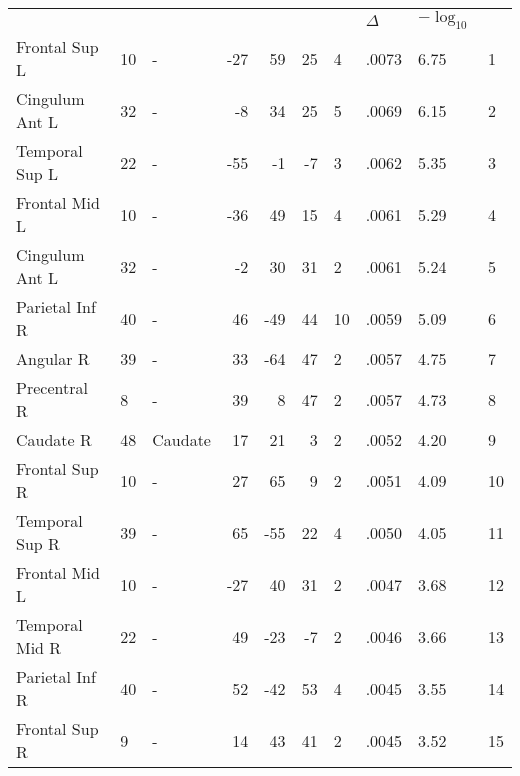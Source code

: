 \begin{table}
    \small
    \centering
    \begin{ThreePartTable}
    \begin{tabularx}{\textwidth}{l l p{1.4cm} *{3}{r} *{2}{P{.8cm}} P{1.3cm} P{.5cm}}
     \\
    \toprule
     &  &  &  &  &  &  & \(\Delta\)  & \(-\log_{10}\) &  \\
    \toprule

    Frontal Sup L  &  10  &  -  &  -27  &  59  &  25  &  4  &   .0073  &  6.75  &  1 \\
    Cingulum Ant L  &  32  &  -  &  -8  &  34  &  25  &  5  &   .0069  &  6.15  &  2 \\
    \midrule
    Temporal Sup L  &  22  &  -  &  -55  &  -1  &  -7  &  3  &   .0062  &  5.35  &  3 \\
    Frontal Mid L  &  10  &  -  &  -36  &  49  &  15  &  4  &   .0061  &  5.29  &  4 \\
    Cingulum Ant L  &  32  &  -  &  -2  &  30  &  31  &  2   &   .0061  &  5.24  &  5 \\
    Parietal Inf R  &  40  &  -  &  46  &  -49  &  44  &  10  &   .0059  &  5.09  &  6 \\
    Angular R  &  39  &  -  &  33  &  -64  &  47  &  2   &   .0057  &  4.75  &  7 \\
    Precentral R  &  8  &  -  &  39  &  8  &  47  &  2   &   .0057  &  4.73  &  8 \\
    Caudate R  &  48  &  Caudate  &  17  &  21  &  3  &  2   &   .0052  &  4.20  &  9 \\
    Frontal Sup R  &  10  &  -  &  27  &  65  &  9  &  2   &   .0051  &  4.09  &  10 \\
    Temporal Sup R  &  39  &  -  &  65  &  -55  &  22  &  4  &   .0050   &  4.05  &  11 \\
    Frontal Mid L  &  10  &  -  &  -27  &  40  &  31  &  2   &   .0047  &  3.68  &  12 \\
    Temporal Mid R  &  22  &  -  &  49  &  -23  &  -7  &  2   &   .0046   &  3.66  &  13 \\
    Parietal Inf R  &  40  &  -  &  52  &  -42  &  53  &  4  &   .0045   &  3.55  &  14 \\
    Frontal Sup R  &  9  &  -  &  14  &  43  &  41  &  2   &   .0045   &  3.52  &  15 \\

\end{tabularx}
\end{ThreePartTable}
\end{table}
